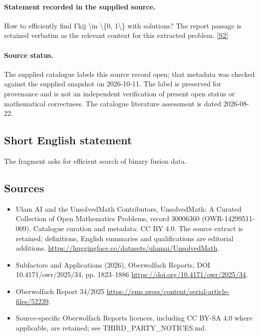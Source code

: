 \documentclass[11pt]{article}
\newcommand{\sref}[2]{\hyperlink{source:#1:#2}{[S#2]}}
\begin{document}
\paragraph{Statement recorded in the supplied source.}
How to eﬃciently ﬁnd Γkij \textbackslash{}in \textbackslash{}\{0, 1\textbackslash{}\} with solutions? The report passage is retained verbatim as the relevant context for this extracted problem. \sref{30006360}{2}
\paragraph{Source status.}
The supplied catalogue labels this source record open; that metadata was checked against the supplied snapshot on 2026-10-11. The label is preserved for provenance and is not an independent verification of present open status or mathematical correctness. The catalogue literature assessment is dated 2026-08-22.
\subsection{Short English statement}
The fragment asks for efficient search of binary fusion data.
\subsection{Sources}
\begin{itemize}
\item[\hypertarget{source:30006360:1}{S1}] Ulam AI and the UnsolvedMath Contributors, UnsolvedMath: A Curated Collection of Open Mathematics Problems, record 30006360 (OWR-14299511-009). Catalogue curation and metadata: CC BY 4.0. The source extract is retained; definitions, English summaries and qualifications are editorial additions.
\url{https://huggingface.co/datasets/ulamai/UnsolvedMath}.
\item[\hypertarget{source:30006360:2}{S2}] Subfactors and Applications (2026), Oberwolfach Reports, DOI 10.4171/owr/2025/34, pp. 1823--1886
\url{https://doi.org/10.4171/owr/2025/34}.
\item[\hypertarget{source:30006360:3}{S3}] Oberwolfach Report 34/2025
\url{https://ems.press/content/serial-article-files/52239}.
\item Source-specific Oberwolfach Reports licences, including CC BY-SA 4.0 where applicable, are retained; see THIRD\_PARTY\_NOTICES.md.
\end{itemize}
\end{document}
